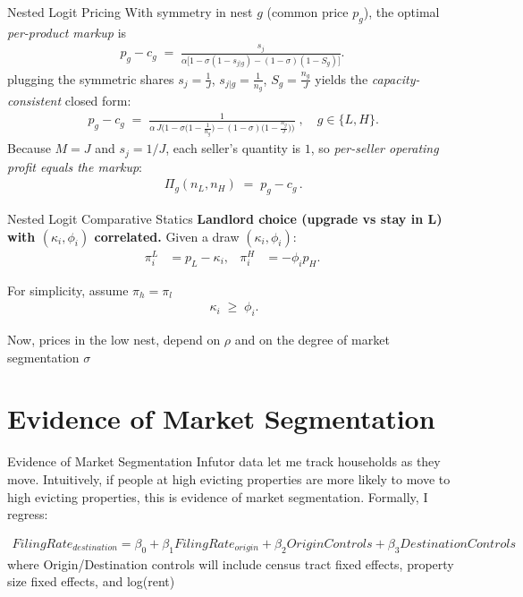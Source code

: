 \documentclass[10pt, xcolor=dvipsnames]{beamer}
\begin{document}
\begin{frame}{Nested Logit Pricing}
    With symmetry in nest $g$ (common price $p_g$), the optimal \emph{per-product markup} is
        \begin{align*}
            p_g - c_g \;=\; \frac{s_j}{\alpha\big[1 - \sigma(1-s_{j|g}) - (1-\sigma)(1-S_g)\big]}.
        \end{align*}
plugging the symmetric shares $s_j=\tfrac{1}{J}$, $s_{j|g}=\tfrac{1}{n_g}$, $S_g=\tfrac{n_g}{J}$ yields the \emph{capacity-consistent} closed form:
\begin{align*}
\boxed{
\,p_g - c_g
\;=\;
\frac{1}{\alpha\,J\Big(1 - \sigma\!\big(1-\tfrac{1}{n_g}\big) - (1-\sigma)\!\big(1-\tfrac{n_g}{J}\big)\Big)}\;,\quad g\in\{L,H\}.
}
\end{align*}
Because $M=J$ and $s_j=1/J$, each seller’s quantity is $1$, so \emph{per-seller operating profit equals the markup}:
\begin{align*}
    \boxed{\,\Pi_g(n_L,n_H) \;=\; p_g - c_g\,}.
\end{align*}
    
\end{frame}

\begin{frame}{Nested Logit Comparative Statics}
    \textbf{Landlord choice (upgrade vs stay in L) with $(\kappa_i,\phi_i)$ correlated.}
Given a draw $(\kappa_i,\phi_i)$:
\begin{align*}
\pi_i^{L} &= p_L - \kappa_i, 
&
\pi_i^{H} &= -\phi_i p_H.
\end{align*}

For simplicity, assume $\pi_h = \pi_l$
\begin{align*}
\boxed{\;\kappa_i  \;\ge\; \phi_i }.
\end{align*}

Now, prices in the low nest, depend on $\rho$ and on the degree of market segmentation $\sigma$

\end{frame}

\section{Evidence of Market Segmentation}

\begin{frame}{Evidence of Market Segmentation}
    Infutor data let me track households as they move. Intuitively, if people at high evicting properties are more likely to move to high evicting properties, this is evidence of market segmentation. Formally, I regress:

    \begin{align*}
        FilingRate_{destination} = \beta_0 +\beta_1FilingRate_{origin} + \beta_2OriginControls + \beta_3DestinationControls 
    \end{align*}
    where Origin/Destination controls will include census tract fixed effects, property size fixed effects, and log(rent)
\end{frame}
\end{document}
